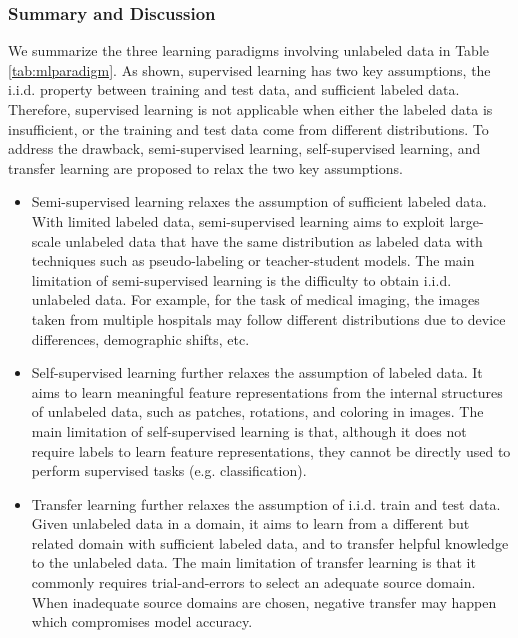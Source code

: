 \documentclass[11pt]{article}
\begin{document}
\subsubsection{Summary and Discussion}
We summarize the three learning paradigms involving unlabeled data in Table \ref{tab:mlparadigm}. As shown, supervised learning has two key assumptions, the i.i.d. property between training and test data, and sufficient labeled data. Therefore, supervised learning is not applicable when either the labeled data is insufficient, or the training and test data come from different distributions. To address the drawback, semi-supervised learning, self-supervised learning, and transfer learning are proposed to relax the two key assumptions. 
\begin{itemize}
    \item Semi-supervised learning relaxes the assumption of sufficient labeled data. With limited labeled data, semi-supervised learning aims to exploit large-scale unlabeled data that have the same distribution as labeled data with techniques such as pseudo-labeling or teacher-student models. The main limitation of semi-supervised learning is the difficulty to obtain i.i.d. unlabeled data. For example, for the task of medical imaging, the images taken from multiple hospitals may follow different distributions due to device differences, demographic shifts, etc. 
    \item Self-supervised learning further relaxes the assumption of labeled data. It aims to learn meaningful feature representations from the internal structures of unlabeled data, such as patches, rotations, and coloring in images. The main limitation of self-supervised learning is that, although it does not require labels to learn feature representations, they cannot be directly used to perform supervised tasks (e.g. classification).   
    \item Transfer learning further relaxes the assumption of i.i.d. train and test data. Given unlabeled data in a domain, it aims to learn from a different but related domain with sufficient labeled data, and to transfer helpful knowledge to the unlabeled data. The main limitation of transfer learning is that it commonly requires trial-and-errors to select an adequate source domain. When inadequate source domains are chosen, negative transfer \cite{rosenstein2005transfer} may happen which compromises model accuracy. 
\end{itemize}
\end{document}

